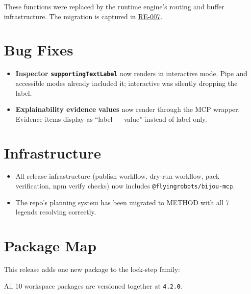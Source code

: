 These functions were replaced by the runtime engine's routing and buffer infrastructure. The migration is captured in \href{https://github.com/flyingrobots/bijou/blob/cbd70612140e7a450d764b3c7be1c6af878b99bc/docs/docs/design/RE-007-migrate-framed-shell-onto-runtime-engine-seams.md}{RE-007}.

\section{Bug Fixes}\label{record-276-bug-fixes}

\begin{itemize}
\tightlist
\item
  \textbf{Inspector \texttt{s\allowbreak{}u\allowbreak{}p\allowbreak{}p\allowbreak{}o\allowbreak{}r\allowbreak{}t\allowbreak{}i\allowbreak{}n\allowbreak{}g\allowbreak{}T\allowbreak{}e\allowbreak{}x\allowbreak{}t\allowbreak{}L\allowbreak{}a\allowbreak{}b\allowbreak{}e\allowbreak{}l}} now renders in interactive mode. Pipe and accessible modes already included it; interactive was silently dropping the label.
\item
  \textbf{Explainability evidence values} now render through the MCP wrapper. Evidence items display as ``label --- value'' instead of label-only.
\end{itemize}

\section{Infrastructure}\label{record-276-infrastructure}

\begin{itemize}
\tightlist
\item
  All release infrastructure (publish workflow, dry-run workflow, pack verification, npm verify checks) now includes \texttt{@\allowbreak{}f\allowbreak{}l\allowbreak{}y\allowbreak{}i\allowbreak{}n\allowbreak{}g\allowbreak{}r\allowbreak{}o\allowbreak{}b\allowbreak{}o\allowbreak{}t\allowbreak{}s\allowbreak{}/\allowbreak{}b\allowbreak{}i\allowbreak{}j\allowbreak{}o\allowbreak{}u\allowbreak{}-\allowbreak{}m\allowbreak{}c\allowbreak{}p}.
\item
  The repo's planning system has been migrated to METHOD with all 7 legends resolving correctly.
\end{itemize}

\section{Package Map}\label{record-276-package-map}

This release adds one new package to the lock-step family:



All 10 workspace packages are versioned together at \texttt{4\allowbreak{}.\allowbreak{}2\allowbreak{}.\allowbreak{}0}.

